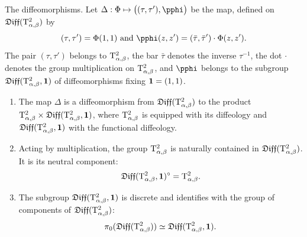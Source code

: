 \begin{Article}{The diffeomorphisms.}{}
  Let $\Delta : \Phi \mapsto \big((\tau,\tau'),\pphi\big)$ be the map,
  defined on $\mathfrak{Diff}(\mathrm{T}^2_{\alpha,\beta})$ by
  $$%
    (\tau,\tau') = \Phi(1,1) \SpacedText{and} \pphi(z,z') = (\bar\tau,\bar\tau') \cdot \Phi(z,z').
    $$%
  The pair $(\tau,\tau')$ belongs to $\mathrm{T}^2_{\alpha,\beta}$,
  the bar $\bar\tau$ denotes the inverse $\tau^{-1}$,
  the dot $\cdot$ denotes the group multiplication on $\mathrm{T}^2_{\alpha,\beta}$,
  and $\pphi$ belongs to the subgroup $\mathfrak{Diff}(\mathrm{T}^2_{\alpha,\beta},{\mathbf{1}})$ of diffeomorphisms fixing ${\mathbf{1}} = (1,1)$.
  
  \begin{enumerate}
    \item The map $\Delta$ is a diffeomorphism from $\mathfrak{Diff}(\mathrm{T}^2_{\alpha,\beta})$ to the product $\mathrm{T}^2_{\alpha,\beta} \times \mathfrak{Diff}(\mathrm{T}^2_{\alpha,\beta},{\mathbf{1}})$,
    where $\mathrm{T}^2_{\alpha,\beta}$ is equipped with its diffeology and $\mathfrak{Diff}(\mathrm{T}^2_{\alpha,\beta},{\mathbf{1}})$ with the functional diffeology.
    \item Acting by multiplication,
    the group $\mathrm{T}^2_{\alpha,\beta}$ is naturally contained in $\mathfrak{Diff}(\mathrm{T}^2_{\alpha,\beta})$.
    It is its neutral component:
    $$%
      \Diff(\Torus^2_{\alpha,\beta},\Id)^\circ=\Torus^2_{\alpha,\beta}.
      $$%
    \item The subgroup $\mathfrak{Diff}(\mathrm{T}^2_{\alpha,\beta},{\mathbf{1}})$ is discrete and identifies with the group of components of $\mathfrak{Diff}(\mathrm{T}^2_{\alpha,\beta})$:
    $$%
      \pi_0(\Diff(\Torus^2_{\alpha,\beta})) \simeq \Diff(\Torus^2_{\alpha,\beta},\Id).
      $$%
  \end{enumerate}
\end{Article}

